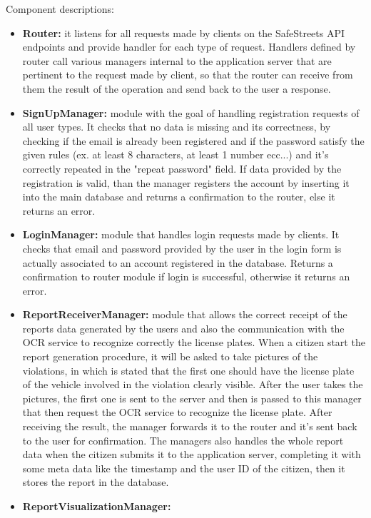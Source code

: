 \bigskip
Component descriptions:
\begin{itemize}
	\item \textbf{Router:} 
	it listens for all requests made by clients on the SafeStreets API endpoints and provide handler for each type of request. Handlers defined by router call various managers internal to the application server that are pertinent to the request made by client, so that the router can receive from them the result of the operation and send back to the user a response.
	\item \textbf{SignUpManager:}
	module with the goal of handling registration requests of all user types. It checks that no data is missing and its correctness, by checking if the email is already been registered and if the password satisfy the given rules (ex. at least 8 characters, at least 1 number ecc...) and it's correctly repeated in the "repeat password" field. If data provided by the registration is valid, than the manager registers the account by inserting it into the main database and returns a confirmation to the router, else it returns an error.
	\item \textbf{LoginManager:}
	module that handles login requests made by clients. It checks that email and password provided by the user in the login form is actually associated to an account registered in the database. Returns a confirmation to router module if login is successful, otherwise it returns an error.
	\item \textbf{ReportReceiverManager:}
	module that allows the correct receipt of the reports data generated by the users and also the communication with the OCR service to recognize correctly the license plates. When a citizen start the report generation procedure, it will be asked to take pictures of the violations, in which is stated that the first one should have the license plate of the vehicle involved in the violation clearly visible. After the user takes the pictures, the first one is sent to the server and then is passed to this manager that then request the OCR service to recognize the license plate. After receiving the result, the manager forwards it to the router and it's sent back to the user for confirmation. The managers also handles the whole report data when the citizen submits it to the application server, completing it with some meta data like the timestamp and the user ID of the citizen, then it stores the report in the database.
	\item \textbf{ReportVisualizationManager:}

\end{itemize}
